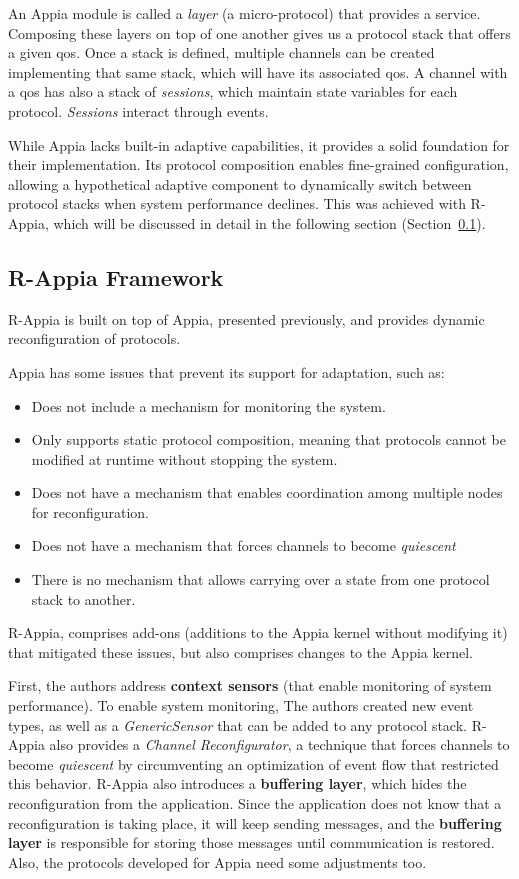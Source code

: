 An Appia module is called a \textit{layer} (a micro-protocol) that provides a service. Composing these layers on top of one another gives us a protocol stack that offers a given \gls{qos}. Once a stack is defined, multiple channels can be created implementing that same stack, which will have its associated \gls{qos}. A channel with a \gls{qos}  has also a stack of \textit{sessions}, which maintain state variables for each protocol. \textit{Sessions} interact through events.

While Appia lacks built-in adaptive capabilities, it provides a solid foundation for their implementation. Its protocol composition enables fine-grained configuration, allowing a hypothetical adaptive component to dynamically switch between protocol stacks when system performance declines. This was achieved with R-Appia, which will be discussed in detail in the following section (Section~\ref{ssec:rappiaframework}).
%
%
%
\subsection{R-Appia Framework}
\label{ssec:rappiaframework}

R-Appia \cite{Rosa2007} is built on top of Appia, presented previously, and provides dynamic reconfiguration of protocols.
\par Appia has some issues that prevent its support for adaptation, such as:
\begin{itemize}
	\item Does not include a mechanism for monitoring the system.
	\item Only supports static protocol composition, meaning that protocols cannot be modified at runtime without stopping the system.
	\item Does not have a mechanism that enables coordination among multiple nodes for reconfiguration.
	\item Does not have a mechanism that forces channels to become \textit{quiescent} 
	\item There is no mechanism that allows carrying over a state from one protocol stack to another.
\end{itemize}

R-Appia, comprises add-ons (additions to the Appia kernel without modifying it) that mitigated these issues, but also comprises changes to the Appia kernel.

First, the authors address \textbf{context sensors} (that enable monitoring of system performance). To enable system monitoring, The authors created new event types, as well as a \textit{GenericSensor} that can be added to any protocol stack. R-Appia also provides a \textit{Channel Reconfigurator}, a technique that forces channels to become \textit{quiescent} by circumventing an optimization of event flow that restricted this behavior. R-Appia also introduces a \textbf{buffering layer}, which hides the reconfiguration from the application. Since the application does not know that a reconfiguration is taking place, it will keep sending messages, and the \textbf{buffering layer} is responsible for storing those messages until communication is restored. Also, the protocols developed for Appia need some adjustments too.

